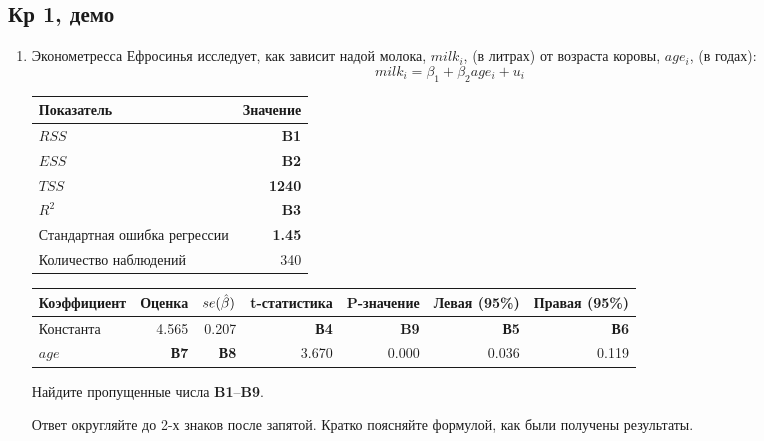 \documentclass[12pt, a4paper]{article}
\begin{document}
\subsection{Кр 1, демо}











\begin{enumerate}


\item Эконометресса Ефросинья исследует, как зависит надой молока, $milk_i$, (в литрах) от возраста коровы, $age_i$, (в годах):
\[
milk_i = \beta_1 + \beta_2 age_i + u_i
\]

\begin{tabular}{lr} \toprule
Показатель & Значение \\
\midrule
$RSS$                        & \textbf{B1} \\
$ESS$                        & \textbf{B2} \\
$TSS$                        & \textbf{1240} \\
$R^2$                        & \textbf{B3} \\
Стандартная ошибка регрессии & \textbf{1.45} \\
Количество наблюдений        & 340 \\
\bottomrule
\end{tabular}

\begin{tabular}{lrrrrrr} \toprule
Коэффициент & Оценка & $se(\hat{\beta})$ & t-статистика & P-значение & Левая (95\%) & Правая (95\%) \\
\midrule
Константа & 4.565 & 0.207 & \textbf{В4} & \textbf{B9} & \textbf{В5} & \textbf{В6} \\
$age$ & \textbf{В7} & \textbf{В8} & 3.670 & 0.000 & 0.036 & 0.119 \\
\bottomrule
\end{tabular}

Найдите пропущенные числа \textbf{B1}--\textbf{B9}.

Ответ округляйте до 2-х знаков после запятой. Кратко поясняйте формулой, как были получены результаты.




\end{enumerate}
\end{document}
